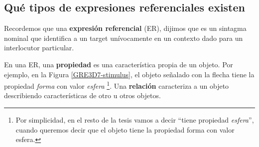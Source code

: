 
\subsection{Qu\'e tipos de expresiones referenciales existen}
\label{sec:tipos_er}

Recordemos que una {\bf expresi\'on referencial} (ER), dijimos que es un sintagma nominal que identifica a un target un\'ivocamente en un contexto dado para un interlocutor particular.

En una ER, una \textbf{propiedad} es una caracter\'istica propia de un objeto. Por ejemplo, en la Figura \ref{GRE3D7-stimulus}, el objeto se\~nalado con la flecha tiene la propiedad {\it forma} con valor {\it esfera} \footnote{Por simplicidad, en el resto de la tesis vamos a decir ``tiene propiedad {\it esfera}'', cuando queremos decir que el objeto tiene la propiedad forma con valor esfera.}. Una \textbf{relaci\'on} caracteriza a un objeto describiendo caracter\'isticas de otro u otros objetos. 


